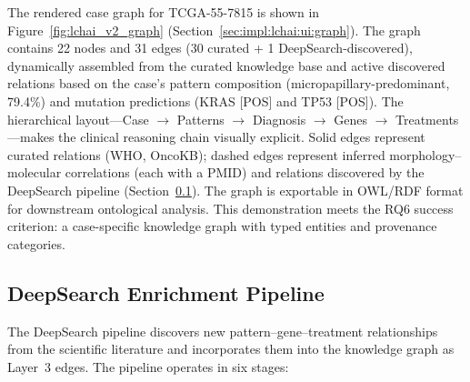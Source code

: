 The rendered case graph for TCGA-55-7815 is shown in
Figure~\ref{fig:lchai_v2_graph} (Section~\ref{sec:impl:lchai:ui:graph}).
The graph contains 22 nodes and 31 edges (30 curated + 1 DeepSearch-discovered),
dynamically assembled from the curated knowledge base and active
discovered relations based on the case's pattern composition
(micropapillary-predominant, 79.4\%) and mutation predictions
(KRAS [POS] and TP53 [POS]).
The hierarchical layout---Case $\to$ Patterns $\to$ Diagnosis $\to$
Genes $\to$ Treatments---makes the clinical reasoning chain visually
explicit.
Solid edges represent curated relations (WHO, OncoKB);
dashed edges represent inferred morphology--molecular correlations
(each with a PMID) and relations discovered by the
DeepSearch pipeline (Section~\ref{sec:impl:ontology:deepsearch}).
The graph is exportable in OWL/RDF format for downstream ontological
analysis.
This demonstration meets the RQ6 success criterion: a case-specific
knowledge graph with typed entities and provenance categories.
 
\subsection{DeepSearch Enrichment Pipeline}
\label{sec:impl:ontology:deepsearch}
 
The DeepSearch pipeline discovers new
pattern--gene--treatment relationships from the scientific literature
and incorporates them into the knowledge graph as Layer~3 edges.
The pipeline operates in six stages:

